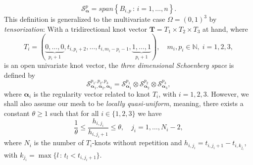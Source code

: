 \begin{equation*}
\mathcal{S}^p_{\bm{\alpha}}= span\left\{ B_{i,p} \,:\, i=1,\ldots,n\right\}.
\end{equation*} 
This definition is generalized to the multivariate case $\Omega=(0,1)^3$ by {\em tensorization}: With a tridirectional knot vector $\bm{T}=T_1 \times T_2 \times T_3$ at hand, where
\begin{equation*}
T_i=(\underbrace{0,\ldots,0}_{p_i+1}, t_{i,p_i+2}, \ldots, t_{i,m_i-p_i-1}, \underbrace{1,\ldots,1}_{p_i+1}),\quad m_i, p_i \in \mathbb{N}, \; i=1,2,3,
\end{equation*} 
is an open univariate knot vector, the {\em three dimensional  Schoenberg space} is defined by 
\begin{equation*}
\bm{\mathcal{S}}^{p_1,p_2,p_3}_{\bm{\alpha}_1,\bm{\alpha}_2,\bm{\alpha}_3}= \mathcal{S}^{p_1}_{\bm{\alpha}_1} \otimes \mathcal{S}^{p_2}_{\bm{\alpha}_2} \otimes \mathcal{S}^{p_3}_{\bm{\alpha}_3},
\end{equation*} 
where $\bm{\alpha}_i$ is the regularity vector related to knot $T_i$, with $i=1,2,3$. However, we shall also assume our mesh to be {\em locally quasi-uniform}, meaning, there exists a constant $\theta \geq 1$ such that for all $i\in \{1,2,3\}$ we have 
\begin{equation*}
\frac{1}{\theta} \leq \frac{h_{i,j_i}}{h_{i,j_i+1}} \leq \theta, \quad j_i=1, \ldots, N_i-2,
\end{equation*}
where $N_i$ is the number of $T_i$-knots without repetition and $h_{i,j_i}=t_{i,j_i+1}-t_{i,k_{j_i}}$, with $k_{j_i}=\max \{l\,:\,t_l < t_{i,j_i+1}\}$.

